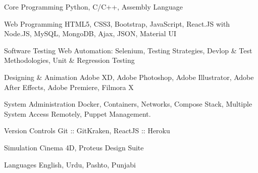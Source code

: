 


\begin{cvskills}


\cvskill
{Core Programming} %
{Python, C/C++, Assembly Language} %


\cvskill
{Web Programming} %
{HTML5, CSS3, Bootstrap, JavaScript, React.JS with Node.JS, MySQL, MongoDB, Ajax, JSON, Material UI} %

\cvskill
{Software Testing} %
{Web Automation: Selenium, Testing Strategies, Devlop \& Test Methodologies, Unit \& Regression Testing} %

\cvskill
{Designing \& Animation} %
{Adobe XD, Adobe Photoshop, Adobe Illustrator, Adobe After Effects, Adobe Premiere, Filmora X} %


\cvskill
{System Administration} %
{Docker, Containers, Networks, Compose Stack, Multiple System Access Remotely, Puppet Management.} %


\cvskill
{Version Controls} %
{Git :: GitKraken, ReactJS :: Heroku} %


\cvskill
{Simulation} %
{Cinema 4D, Proteus Design Suite } %


\cvskill
{Languages} %
{English, Urdu, Pashto, Punjabi} %

\end{cvskills}




